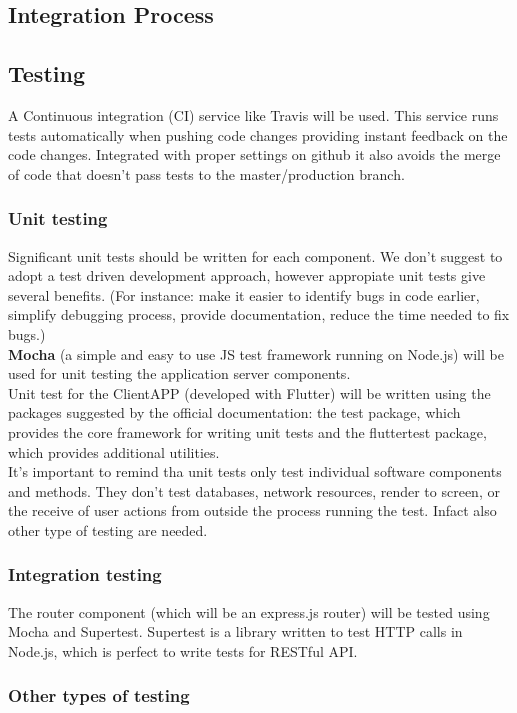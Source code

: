 \documentclass{article}
\begin{document}
\subsection{Integration Process}

\subsection{Testing}
A Continuous integration (CI) service like Travis will be used. This service runs tests automatically when pushing code changes providing instant feedback on the code changes. Integrated with proper settings on github it also avoids the merge of code that doesn't pass tests to the master/production branch.
\subsubsection{Unit testing}
Significant unit tests should be written for each component. We don't suggest to adopt a test driven development approach, however appropiate unit tests give several benefits.
(For instance: make it easier to identify bugs in code earlier, simplify debugging process, provide documentation, reduce the time needed to fix bugs.)\\
\textbf{Mocha} (a simple and easy to use JS test framework running on Node.js) will be used for unit testing the application server components.\\
Unit test for the ClientAPP  (developed with Flutter) will be written using the packages suggested by the official documentation: the test package, which provides the core framework for writing unit tests and the fluttertest package, which provides additional utilities.\\
It's important to remind tha unit tests only test individual software components and methods. They don't test databases, network resources, render to screen, or the receive of user actions from outside the process running the test.
Infact also other type of testing are needed.

\subsubsection{Integration testing}
The router component (which will be an express.js router) will be tested using Mocha and Supertest. 
Supertest is a library written to test HTTP calls in Node.js, which is perfect to write tests for RESTful API.

\subsubsection{Other types of testing}
\end{document}
